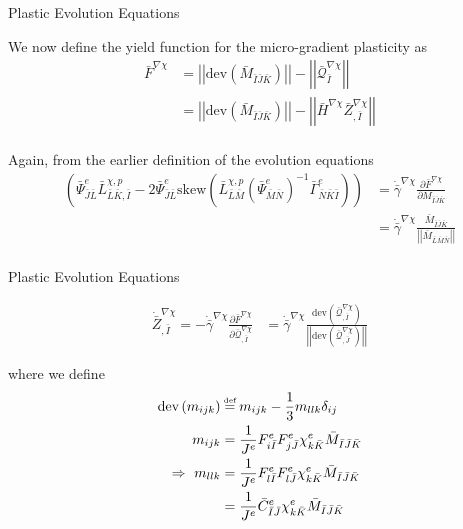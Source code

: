 \documentclass[11pt]{beamer}
\newcommand\defeq{\mathrel{\stackrel{\makebox[0pt]{\mbox{\normalfont\tiny def}}}{=}}}
\newcommand{\LTN}[1]{\left|\left| #1 \right|\right|}
\newcommand{\dev}[1]{\text{dev}\left(#1\right)}
\begin{document}
\begin{frame}{Plastic Evolution Equations}

We now define the yield function for the micro-gradient plasticity as
\begin{align*}
\bar{F}^{\nabla \chi} &= \LTN{\dev{\bar{M}_{\bar{I}\bar{J}\bar{K}}}} - \LTN{\bar{\mathcal{Q}}_{\bar{I}}^{\nabla \chi}}\\
&= \LTN{\dev{\bar{M}_{\bar{I}\bar{J}\bar{K}}}} - \LTN{\bar{H}^{\nabla \chi} \bar{Z}_{,\bar{I}}^{\nabla \chi}}\\
\end{align*}

Again, from the earlier definition of the evolution equations
\begin{align*}
\left(\bar{\Psi}_{\bar{J}\bar{L}}^e\bar{L}_{\bar{L}\bar{K},\bar{I}}^{\chi,p}-2\bar{\Psi}_{\bar{J}\bar{L}}^e\text{skew}\left(\bar{L}_{\bar{L}\bar{M}}^{\chi,p}\left(\bar{\Psi}_{\bar{M}\bar{N}}^e\right)^{-1} \bar{\Gamma}_{\bar{N}\bar{K}\bar{I}}^e\right)\right) &= \dot{\bar{\gamma}}^{\nabla \chi} \frac{\partial \bar{F}^{\nabla\chi}}{\partial M_{\bar{I}\bar{J}\bar{K}}}\\
&= \dot{\bar{\gamma}}^{\nabla \chi} \frac{\bar{M}_{\bar{I}\bar{J}\bar{K}}}{\LTN{\bar{M}_{\bar{L}\bar{M}\bar{N}}}}\\
\end{align*}

\end{frame}

\begin{frame}{Plastic Evolution Equations}

\begin{align*}
\dot{\bar{Z}}_{,\bar{I}}^{\nabla \chi} = - \dot{\bar{\gamma}}^{\nabla \chi} \frac{\partial \bar{F}^{\nabla \chi}}{\partial \bar{\mathcal{Q}}_{,\bar{I}}^{\nabla \chi}} &= \dot{\bar{\gamma}}^{\nabla \chi} \frac{\dev{\bar{\mathcal{Q}}_{,\bar{I}}^{\nabla \chi}}}{\LTN{\dev{\bar{\mathcal{Q}}_{,\bar{J}}^{\nabla \chi}}}}
\end{align*}

where we define
\begin{align*}
\dev{m_{ijk}} &\defeq m_{ijk} - \frac{1}{3} m_{llk}\delta_{ij}\\
m_{ijk} &= \frac{1}{J^e} F_{i\bar{I}}^e F_{j\bar{J}}^e \chi_{k\bar{K}}^e \bar{M}_{\bar{I}\bar{J}\bar{K}}\\
\Rightarrow\ m_{llk} &= \frac{1}{J^e} F_{l\bar{I}}^e F_{l\bar{J}}^e \chi_{k\bar{K}}^e \bar{M}_{\bar{I}\bar{J}\bar{K}}\\
&= \frac{1}{J^e} \bar{C}_{\bar{I}\bar{J}}^e \chi_{k\bar{K}}^e \bar{M}_{\bar{I}\bar{J}\bar{K}}\\
\end{align*}

\end{frame}
\end{document}
